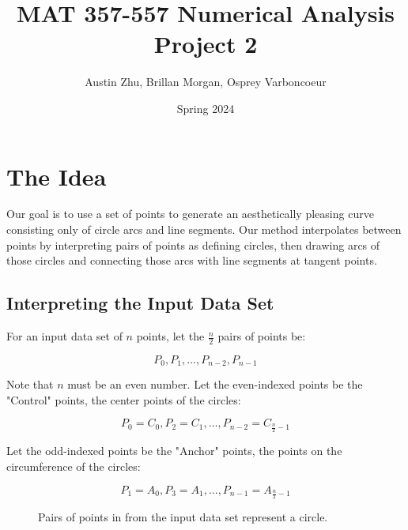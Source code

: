 \documentclass{article}
\title{MAT 357-557 Numerical Analysis Project 2}
\author{Austin Zhu, Brillan Morgan, Osprey Varboncoeur}
\date{Spring 2024}
\begin{document}
\maketitle

\section{The Idea}
\label{sec:the_idea}
Our goal is to use a set of points to generate an aesthetically pleasing curve consisting only of circle arcs and line segments. Our method interpolates between points by interpreting pairs of points as defining circles, then drawing arcs of those circles and connecting those arcs with line segments at tangent points.

\subsection{Interpreting the Input Data Set}
For an input data set of \( n \) points, let the \( \frac{n}{2} \) pairs of points be:

\[ P_0, P_1, \ldots, P_{n-2}, P_{n-1} \]

Note that \( n \) must be an even number. Let the even-indexed points be the "Control" points, the center points of the circles:

\[ P_0 = C_0, P_2 = C_1, \ldots, P_{n-2} = C_{\frac{n}{2}-1} \]

Let the odd-indexed points be the "Anchor" points, the points on the circumference of the circles:

\[ P_1 = A_0, P_3 = A_1, \ldots, P_{n-1} = A_{\frac{n}{2}-1} \]


\begin{figure}
\centering
{}
\caption{Pairs of points in from the input data set represent a circle.}
\label{fig:pairs_of_points_define_a_circle}
\end{figure}

\end{document}
